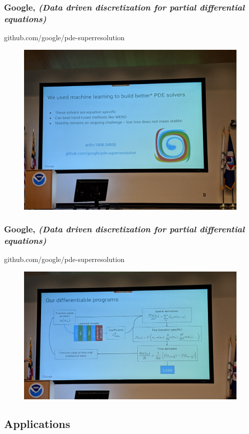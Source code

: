 \documentclass{beamer}
\begin{document}
\begin{frame}
\frametitle{Google, \textit{(Data driven discretization for partial differential equations)}}
github.com/google/pde-superresolution
\begin{figure}
	\includegraphics[width=.9\linewidth]{figs/IMG_20190424_155250.jpg}
\end{figure}
\end{frame}

\begin{frame}
\frametitle{Google, \textit{(Data driven discretization for partial differential equations)}}
github.com/google/pde-superresolution
\begin{figure}
	\includegraphics[width=.9\linewidth]{figs/IMG_20190424_155519.jpg}
\end{figure}
\end{frame}

\subsection{Applications}
\end{document}
